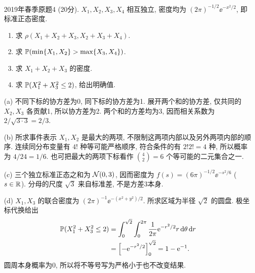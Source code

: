\begin{exercise}\label{m2:2019s:q4}
2019年春季原题4 (20分). $X_1,X_2,X_3,X_4$ 相互独立, 密度均为 $(2\pi)^{-1/2}\ee^{-x^2/2}$, 即标准正态密度.
\begin{enumerate}
\item[(a)]\label{m2:2019s:q4:a} 求 $\rho(X_1+X_2+X_3,X_2+X_3+X_4)$.
\item[(b)]\label{m2:2019s:q4:b} 求 $\mathbb P(\min\{X_1,X_2\}>\max\{X_3,X_4\})$.
\item[(c)]\label{m2:2019s:q4:c} 求 $X_1+X_2+X_3$ 的密度.
\item[(d)]\label{m2:2019s:q4:d} 求 $\mathbb P(X_1^2+X_3^2\le2)$, 给出明确值.
\end{enumerate}
\end{exercise}
\begin{solution}
(a) 不同下标的协方差为0, 同下标的协方差为1. 展开两个和的协方差, 仅共同的 $X_2,X_3$ 各贡献1, 所以协方差为2. 两个和的方差均为3, 因而相关系数为 $2/\sqrt{3\cdot3}=2/3$.

(b) 所求事件表示 $X_1,X_2$ 是最大的两项, 不限制这两项内部以及另外两项内部的顺序. 连续同分布变量有 $4!$ 种等可能严格顺序, 符合条件的有 $2!2!=4$ 种, 所以概率为 $4/24=1/6$. 也可把最大的两项下标看作 $\binom42=6$ 个等可能的二元集合之一.

(c) 三个独立标准正态之和为 $\mathcal N(0,3)$, 因而密度为 $f(s)=(6\pi)^{-1/2}\ee^{-s^2/6}$ ($s\in\mathbb R$). 分母的尺度 $\sqrt3$ 来自标准差, 不是方差3本身.

(d) $X_1,X_3$ 的联合密度为 $(2\pi)^{-1}\ee^{-(x^2+y^2)/2}$. 所求区域为半径 $\sqrt2$ 的圆盘. 极坐标代换给出
\begin{align*}
\mathbb P(X_1^2+X_3^2\le2)
&=\int_0^{\sqrt2}\int_0^{2\pi}\frac1{2\pi}\mathrm e^{-r^2/2}r\,\mathrm d\theta\,\mathrm d r\\
&=\left[-\mathrm e^{-r^2/2}\right]_0^{\sqrt2}=1-\mathrm e^{-1}.
\end{align*}
圆周本身概率为0, 所以将不等号写为严格小于也不改变结果.
\end{solution}

